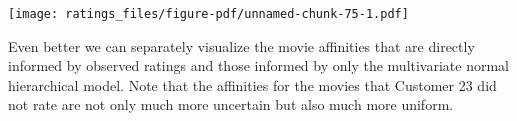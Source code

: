 \documentclass[
  letterpaper,
  DIV=11,
  numbers=noendperiod]{scrartcl}
\newenvironment{Shaded}{\begin{snugshade}}{\end{snugshade}}
\newcommand{\AttributeTok}[1]{\textcolor[rgb]{0.40,0.45,0.13}{#1}}
\newcommand{\ControlFlowTok}[1]{\textcolor[rgb]{0.00,0.23,0.31}{#1}}
\newcommand{\DecValTok}[1]{\textcolor[rgb]{0.68,0.00,0.00}{#1}}
\newcommand{\FunctionTok}[1]{\textcolor[rgb]{0.28,0.35,0.67}{#1}}
\newcommand{\NormalTok}[1]{\textcolor[rgb]{0.00,0.23,0.31}{#1}}
\newcommand{\OtherTok}[1]{\textcolor[rgb]{0.00,0.23,0.31}{#1}}
\newcommand{\SpecialCharTok}[1]{\textcolor[rgb]{0.37,0.37,0.37}{#1}}
\newcommand{\StringTok}[1]{\textcolor[rgb]{0.13,0.47,0.30}{#1}}
\begin{document}
\begin{Shaded}
\end{Shaded}

\texttt{[image: ratings\_files/figure-pdf/unnamed-chunk-75-1.pdf]}

Even better we can separately visualize the movie affinities that are
directly informed by observed ratings and those informed by only the
multivariate normal hierarchical model. Note that the affinities for the
movies that Customer 23 did not rate are not only much more uncertain
but also much more uniform.
\end{document}
